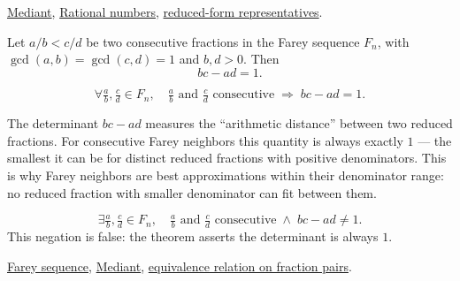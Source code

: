 \begin{remark*}[Dependencies]
\hyperref[def:mediant]{Mediant},
\hyperref[def:rational-numbers]{Rational numbers},
\hyperref[thm:fraction-pair-equivalence]{reduced-form representatives}.
\end{remark*}

\begin{tcolorbox}[colback=thmbox, colframe=thmborder, arc=2pt,
  left=6pt, right=6pt, top=4pt, bottom=4pt,
  title={\small\textbf{Theorem (Farey Neighbor Theorem)}},
  fonttitle=\small\bfseries]
\begin{theorem}
\label{thm:farey-neighbor-theorem}
Let $a/b < c/d$ be two consecutive fractions in the Farey sequence $F_n$,
with $\gcd(a,b) = \gcd(c,d) = 1$ and $b,d > 0$.  Then
\[
bc - ad = 1.
\]
\end{theorem}
\end{tcolorbox}

\begin{remark*}
\[
\forall \tfrac{a}{b}, \tfrac{c}{d} \in F_n,\quad
\tfrac{a}{b} \text{ and } \tfrac{c}{d} \text{ consecutive}
\;\Longrightarrow\;
bc - ad = 1.
\]
\end{remark*}

\begin{remark*}[Interpretation]
The determinant $bc - ad$ measures the ``arithmetic distance'' between two
reduced fractions.  For consecutive Farey neighbors this quantity is always
exactly $1$ — the smallest it can be for distinct reduced fractions with
positive denominators.  This is why Farey neighbors are best approximations
within their denominator range: no reduced fraction with smaller denominator
can fit between them.
\end{remark*}

\begin{remark*}
\[
\exists \tfrac{a}{b}, \tfrac{c}{d} \in F_n,\quad
\tfrac{a}{b} \text{ and } \tfrac{c}{d} \text{ consecutive}
\;\land\; bc - ad \neq 1.
\]
This negation is false: the theorem asserts the determinant is always $1$.
\end{remark*}

\begin{remark*}[Dependencies]
\hyperref[def:farey-sequence]{Farey sequence},
\hyperref[def:mediant]{Mediant},
\hyperref[thm:fraction-pair-equivalence]{equivalence relation on fraction pairs}.
\end{remark*}

